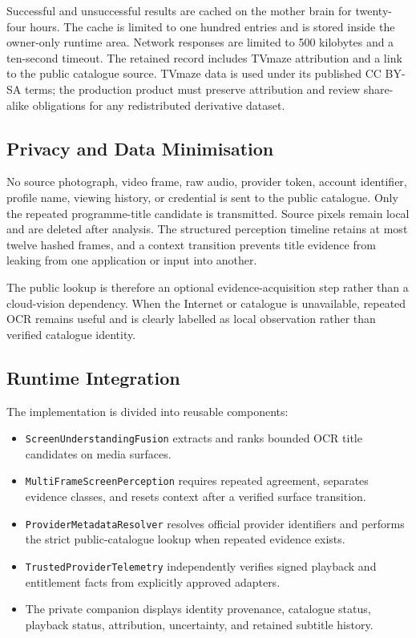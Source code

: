 Successful and unsuccessful results are cached on the mother brain for twenty-four
hours. The cache is limited to one hundred entries and is stored inside the
owner-only runtime area. Network responses are limited to 500 kilobytes and a
ten-second timeout. The retained record includes TVmaze attribution and a link to
the public catalogue source. TVmaze data is used under its published CC BY-SA
terms; the production product must preserve attribution and review share-alike
obligations for any redistributed derivative dataset.

\subsection{Privacy and Data Minimisation}

No source photograph, video frame, raw audio, provider token, account identifier,
profile name, viewing history, or credential is sent to the public catalogue.
Only the repeated programme-title candidate is transmitted. Source pixels remain
local and are deleted after analysis. The structured perception timeline retains
at most twelve hashed frames, and a context transition prevents title evidence
from leaking from one application or input into another.

The public lookup is therefore an optional evidence-acquisition step rather than
a cloud-vision dependency. When the Internet or catalogue is unavailable, repeated
OCR remains useful and is clearly labelled as local observation rather than
verified catalogue identity.

\subsection{Runtime Integration}

The implementation is divided into reusable components:

\begin{itemize}
  \item \texttt{ScreenUnderstandingFusion} extracts and ranks bounded OCR title
        candidates on media surfaces.
  \item \texttt{MultiFrameScreenPerception} requires repeated agreement, separates
        evidence classes, and resets context after a verified surface transition.
  \item \texttt{ProviderMetadataResolver} resolves official provider identifiers
        and performs the strict public-catalogue lookup when repeated evidence exists.
  \item \texttt{TrustedProviderTelemetry} independently verifies signed playback
        and entitlement facts from explicitly approved adapters.
  \item The private companion displays identity provenance, catalogue status,
        playback status, attribution, uncertainty, and retained subtitle history.
\end{itemize}

